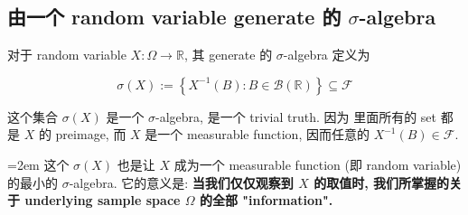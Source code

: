\subsection{\texorpdfstring{由一个 random variable generate 的 \(\mathit{\sigma}\)-algebra}{由一个 random variable generate 的 \textbackslash mathit\{\textbackslash sigma\}-algebra}}\label{ux7531ux4e00ux4e2a-random-variable-generate-ux7684-mathitsigma-algebra}

\begin{definition}{}

对于 random variable \(\mathit{X}:\Omega\rightarrow\mathbb{R}\), 其 generate 的 \(\mathit{\sigma}\)-algebra 定义为

\[\mathit{\sigma}(\mathit{X}) := \left\{ {\mathit{X}^{- 1}(\mathit{B}):\mathit{B} \in \mathcal{B}(\mathbb{R})} \right\} \subseteq \mathcal{F}\]

\end{definition}

这个集合 \(\mathit{\sigma}(\mathit{X})\) 是一个 \(\mathit{\sigma}\)-algebra, 是一个 trivial truth. 因为 里面所有的 set 都是 \(\mathit{X}\) 的 preimage, 而 \(\mathit{X}\) 是一个 measurable function, 因而任意的 \(\mathit{X}^{- 1}(\mathit{B}) \in \mathcal{F}\).

{\emergencystretch=2em
这个 \(\mathit{\sigma}(\mathit{X})\) 也是让 \(\mathit{X}\) 成为一个 measurable function (即 random variable) 的最小的 \(\mathit{\sigma}\)-algebra. 它的意义是: \textbf{当我们仅仅观察到 \(\mathit{X}\) 的取值时, 我们所掌握的关于 underlying sample space \(\Omega\) 的全部 "information".}\par}


